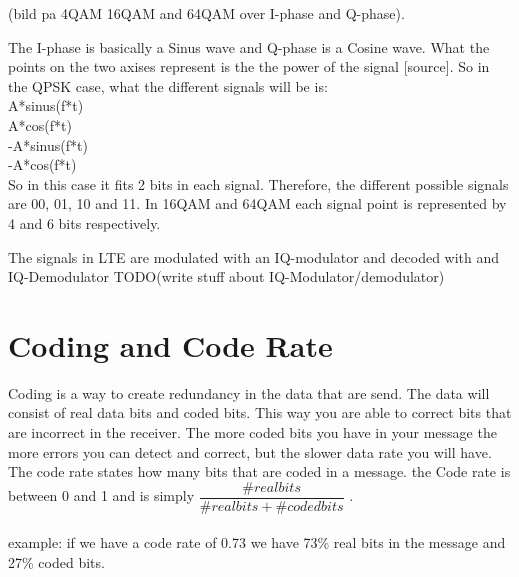 \documentclass[cropmarks, frame, english]{idamasterthesis}
\begin{document}
(bild pa 4QAM 16QAM and 64QAM over I-phase and Q-phase). 
 
The I-phase is basically a Sinus wave and Q-phase is a Cosine wave. What the points on the two axises represent is the the power of the signal [source]. So in the QPSK case, what the different signals will be is:\\
 A*sinus(f*t)\\
 A*cos(f*t)\\
 -A*sinus(f*t) \\  
 -A*cos(f*t)\\
 
 So in this case it fits 2 bits in each signal. Therefore, the different possible signals are 00, 01, 10 and 11. In 16QAM and 64QAM each signal point is represented by 4 and 6 bits respectively.

The signals in LTE are modulated with an IQ-modulator and decoded with and IQ-Demodulator 
TODO(write stuff about IQ-Modulator/demodulator)

\section{Coding and Code Rate}
Coding is a way to create redundancy in the data that are send. The data will consist of real data bits and coded bits. This way you are able to correct bits that are incorrect in the receiver. The more coded bits you have in your message the more errors you can detect and correct, but the slower data rate you will have. The code rate states how many bits that are coded in a message. the Code rate is between 0 and 1 and is simply $\dfrac{\# real bits}{ \# real bits + \# coded bits}$ . 
\\ \\
example: if we have a code rate of 0.73 we have 73\% real bits in the message and 27\% coded bits. 
\end{document}
